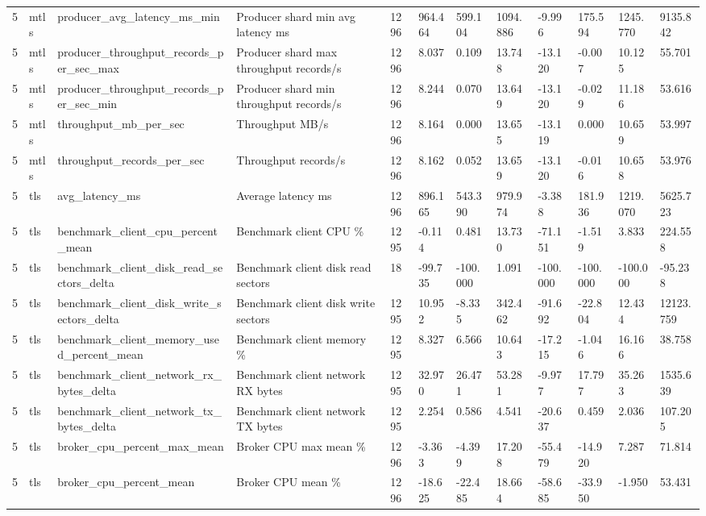 \begin{longtable}{llllllllllll}
5 & mtls & producer\_avg\_latency\_ms\_min & Producer shard min avg latency ms & 1296 & 964.464 & 599.104 & 1094.886 & -9.996 & 175.594 & 1245.770 & 9135.842 \\
5 & mtls & producer\_throughput\_records\_per\_sec\_max & Producer shard max throughput records/s & 1296 & 8.037 & 0.109 & 13.748 & -13.120 & -0.007 & 10.125 & 55.701 \\
5 & mtls & producer\_throughput\_records\_per\_sec\_min & Producer shard min throughput records/s & 1296 & 8.244 & 0.070 & 13.649 & -13.120 & -0.029 & 11.186 & 53.616 \\
5 & mtls & throughput\_mb\_per\_sec & Throughput MB/s & 1296 & 8.164 & 0.000 & 13.655 & -13.119 & 0.000 & 10.659 & 53.997 \\
5 & mtls & throughput\_records\_per\_sec & Throughput records/s & 1296 & 8.162 & 0.052 & 13.659 & -13.120 & -0.016 & 10.658 & 53.976 \\
5 & tls & avg\_latency\_ms & Average latency ms & 1296 & 896.165 & 543.390 & 979.974 & -3.388 & 181.936 & 1219.070 & 5625.723 \\
5 & tls & benchmark\_client\_cpu\_percent\_mean & Benchmark client CPU \% & 1295 & -0.114 & 0.481 & 13.730 & -71.151 & -1.519 & 3.833 & 224.558 \\
5 & tls & benchmark\_client\_disk\_read\_sectors\_delta & Benchmark client disk read sectors & 18 & -99.735 & -100.000 & 1.091 & -100.000 & -100.000 & -100.000 & -95.238 \\
5 & tls & benchmark\_client\_disk\_write\_sectors\_delta & Benchmark client disk write sectors & 1295 & 10.952 & -8.335 & 342.462 & -91.692 & -22.804 & 12.434 & 12123.759 \\
5 & tls & benchmark\_client\_memory\_used\_percent\_mean & Benchmark client memory \% & 1295 & 8.327 & 6.566 & 10.643 & -17.215 & -1.046 & 16.166 & 38.758 \\
5 & tls & benchmark\_client\_network\_rx\_bytes\_delta & Benchmark client network RX bytes & 1295 & 32.970 & 26.471 & 53.281 & -9.977 & 17.797 & 35.263 & 1535.639 \\
5 & tls & benchmark\_client\_network\_tx\_bytes\_delta & Benchmark client network TX bytes & 1295 & 2.254 & 0.586 & 4.541 & -20.637 & 0.459 & 2.036 & 107.205 \\
5 & tls & broker\_cpu\_percent\_max\_mean & Broker CPU max mean \% & 1296 & -3.363 & -4.399 & 17.208 & -55.479 & -14.920 & 7.287 & 71.814 \\
5 & tls & broker\_cpu\_percent\_mean & Broker CPU mean \% & 1296 & -18.625 & -22.485 & 18.664 & -58.685 & -33.950 & -1.950 & 53.431 \\

\end{longtable}
